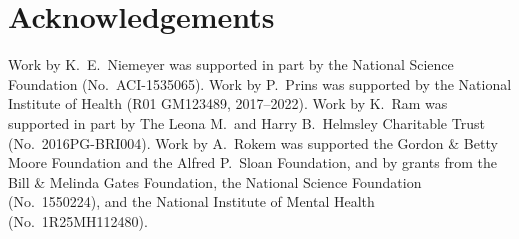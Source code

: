 \documentclass{article}
\newcommand{\add}[1]{{\sloppy\cbcolor{teal}\textcolor{teal}{\cbstart {#1}\cbend}}}  %
\begin{document}
\section*{Acknowledgements}

Work by K.~E.~Niemeyer was supported in part by the National Science Foundation (No.\ ACI-1535065).
Work by P.~Prins was supported by the National Institute of Health (R01 GM123489, 2017--2022).
Work by K.~Ram was supported in part by The Leona M.\ and Harry B.~Helmsley Charitable Trust (No.\ 2016PG-BRI004).
Work by A.~Rokem was supported \add{by} the Gordon \& Betty Moore Foundation and
the Alfred P.~Sloan Foundation, and by grants from the Bill \& Melinda Gates
Foundation, the National Science Foundation (No.\ 1550224), and the National
Institute of Mental Health (No.\ 1R25MH112480).

\printbibliography
\end{document}
